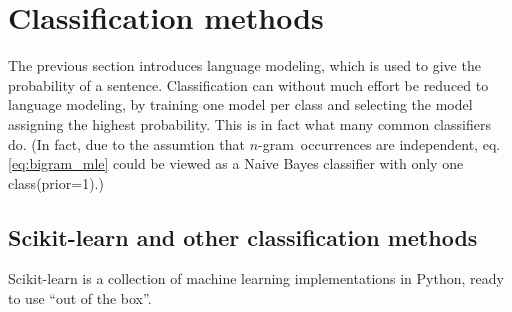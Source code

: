 \documentclass[a4paper,11pt]{kth-mag}
\newcommand{\ngram}{$n$-gram}
\begin{document}
%
%
%
%

\section{Classification methods}
The previous section introduces language modeling, which is used to give the probability of a sentence.
Classification can without much effort be reduced to language modeling, by training one model per class and
selecting the model assigning the highest probability. This is in fact what many common classifiers do.
(In fact, due to the assumtion that \ngram~occurrences are independent, eq. \ref {eq:bigram_mle}
could be viewed as a Naive Bayes classifier with only one class(prior=1).)



\subsection{Scikit-learn and other classification methods}
Scikit-learn\cite{scikit-learn} is a collection of machine learning implementations in Python, ready to use ``out of the box''.
\end{document}
